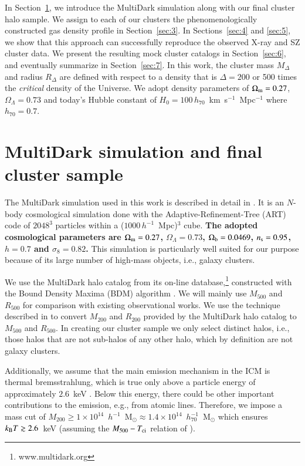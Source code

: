 \documentclass[useAMS,usenatbib]{mn2e}
\begin{document}
{  In Section~\ref{sec:2}, we introduce the MultiDark simulation along with our
  final cluster halo sample. We assign to each of our clusters the
  phenomenologically constructed gas density profile in Section~\ref{sec:3}. In
  Sections~\ref{sec:4} and \ref{sec:5}, we show that this approach can
  successfully reproduce the observed X-ray and SZ cluster data. We present the
  resulting mock cluster catalogs in Section~\ref{sec:6}, and eventually
  summarize in Section~\ref{sec:7}.  In this work, the cluster mass $M_{\Delta}$
  and radius $R_{\Delta}$ are defined with respect to a density that is
  $\Delta=200$ or 500 times the \emph{critical} density of the Universe. We
  adopt density parameters of $\Omega_{{\mathrm{m}}}=0.27$, $\Omega_{\Lambda}=0.73$ and
  today's Hubble constant of $H_0 = 100\, h_{70}$~km~s$^{-1}$~Mpc$^{-1}$ where
  $h_{70} = 0.7$.}




\section{MultiDark simulation and final cluster sample}
\label{sec:2}
The MultiDark simulation used in this work is described in detail in
\cite{2011arXiv1104.5130P}.  It is an $N$-body cosmological simulation done with
the Adaptive-Refinement-Tree (ART) code \citep{1997ApJS..111...73K} of $2048^3$
particles within a ($1000\,h^{-1}$~Mpc)$^3$ cube. {\bf The adopted cosmological
  parameters are $\Omega_{{\mathrm{m}}}=0.27$, $\Omega_{\Lambda}=0.73$,
  $\Omega_{\mathrm{b}}=0.0469$, $n_{\mathrm{s}}=0.95$, $h=0.7$ and $\sigma_8=0.82$.} This
simulation is particularly well suited for our purpose because of its large
number of high-mass objects, i.e., galaxy clusters.
 
We use the MultiDark halo catalog from its on-line database,\footnote{www.multidark.org} 
constructed with the Bound Density Maxima (BDM) algorithm \citep{1997astro.ph.12217K}.  
We will mainly use $M_{500}$ and $R_{500}$ for comparison with existing observational works.  
We use the technique described in \cite{2003ApJ...584..702H} to convert $M_{200}$ and
$R_{200}$ provided by the MultiDark halo catalog to $M_{500}$ and $R_{500}$.  In
creating our cluster sample we only select distinct halos, i.e., those halos that
are not sub-halos of any other halo, which by definition are not galaxy clusters.

Additionally, we assume that the main emission mechanism in the ICM is thermal
bremsstrahlung, which is true only above a particle energy of approximately
$2.6$~keV \citep{1988xrec.book.....S}. Below this
energy, there could be other important contributions to the emission,
e.g., from atomic lines. Therefore, we impose a mass cut of
$M_{200}\geq1\times10^{14}$~$h^{-1}$~M$_{\odot}\approx1.4\times10^{14}$~$h_{70}^{-1}$~M$_{\odot}$
which ensures $k_{{\mathrm{B}}}T \gtrsim 2.6$~keV (assuming the $M_{500} - T_{{\mathrm{ci}}}$ relation
of \citealt{2010MNRAS.406.1773M}).
\end{document}

